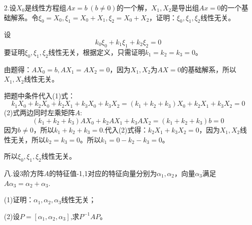 \documentclass{article}
\begin{document}
2.设$X_{0}$是线性方程组$Ax=b~(b\neq0)$的一个解，$X_{1},X_{2}$是导出组$Ax=0$的一个基础解系。令$\xi_{0}=X_{0},\xi_{1}=X_{0}+X_{1},\xi_{2}=X_{0}+X_{2}$，证明：$\xi_{0},\xi_{1},\xi_{2}$线性无关。

\begin{zhengming}
设
\begin{equation*}
k_{0}\xi_0+k_1\xi_1+k_2\xi_2=0\tag{$1$}
\end{equation*}
要证明$\xi_{0},\xi_{1},\xi_{2}$线性无关，根据定义，只需证明$k_1=k_2=k_3=0$。

由题得：$AX_0=b,AX_1=AX_2=0$，因为$X_1,X_2$为$AX=0$的基础解系，所以$X_1,X_2$线性无关。

把题中条件代入(1)式：
\begin{equation*}
k_1X_0+k_2X_0+k_2X_1+k_3X_0+k_3X_2= (k_1+k_2+k_3)X_0+k_2X_1+k_3X_2=0\tag{$2$}
\end{equation*}
(2)式两边同时左乘矩阵$A$:
\begin{equation*}
(k_1+k_2+k_3)AX_0+k_2AX_1+k_3AX_2=(k_1+k_2+k_3)b=0
\end{equation*}
因为$b\neq0$，所以$k_1+k_2+k_3=0$.代入(2)式得：$k_2X_1+k_3X_2=0$，因为$X_1,X_2$线性无关，所以$k_2=k_3=0$。所以$k_1=0-k_2-k_3=0$。

所以$\xi_{0},\xi_{1},\xi_{2}$线性无关。
\end{zhengming}

八.设3阶方阵$A$的特征值-1,1对应的特征向量分别为$\alpha_{1},\alpha_{2}$，向量$\alpha_{3}$满足$A\alpha_{3}=\alpha_{2}+\alpha_{3}$.

(1)证明：$\alpha_{1},\alpha_{2},\alpha_{3}$线性无关；

(2)设$P=[\alpha_{1},\alpha_{2},\alpha_{3}]$,求$P^{-1}AP$。
\end{document}
